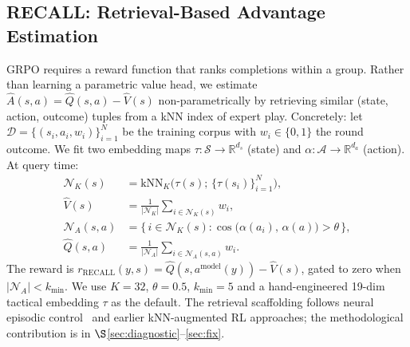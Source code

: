 \documentclass{article}
\begin{document}

\subsection{RECALL: Retrieval-Based Advantage Estimation}
\label{sec:recall}

GRPO requires a reward function that ranks completions within a group. Rather than learning a parametric value head, we estimate $\hat{A}(s,a) = \hat{Q}(s,a) - \hat{V}(s)$ non-parametrically by retrieving similar (state, action, outcome) tuples from a kNN index of expert play. Concretely: let $\mathcal{D} = \{(s_i, a_i, w_i)\}_{i=1}^N$ be the training corpus with $w_i \in \{0,1\}$ the round outcome. We fit two embedding maps $\tau\colon \mathcal{S} \to \mathbb{R}^{d_s}$ (state) and $\alpha\colon \mathcal{A} \to \mathbb{R}^{d_a}$ (action). At query time:
\begin{align}
\mathcal{N}_K(s) &= \mathrm{kNN}_K\bigl(\tau(s);\, \{\tau(s_i)\}_{i=1}^N\bigr), \\
\hat{V}(s) &= \frac{1}{|\mathcal{N}_K|} \sum_{i \in \mathcal{N}_K(s)} w_i, \\
\mathcal{N}_A(s, a) &= \{\, i \in \mathcal{N}_K(s) : \cos\bigl(\alpha(a_i),\, \alpha(a)\bigr) > \theta \,\}, \\
\hat{Q}(s, a) &= \frac{1}{|\mathcal{N}_A|} \sum_{i \in \mathcal{N}_A(s,a)} w_i.
\end{align}
The reward is $r_{\text{RECALL}}(y, s) = \hat{Q}(s, a^{\text{model}}(y)) - \hat{V}(s)$, gated to zero when $|\mathcal{N}_A| < k_{\min}$. We use $K{=}32$, $\theta{=}0.5$, $k_{\min}{=}5$ and a hand-engineered 19-dim tactical embedding $\tau$ as the default. The retrieval scaffolding follows neural episodic control~\cite{pritzel2017neural} and earlier kNN-augmented RL approaches; the methodological contribution is in $\S$\ref{sec:diagnostic}--\ref{sec:fix}.
\end{document}
